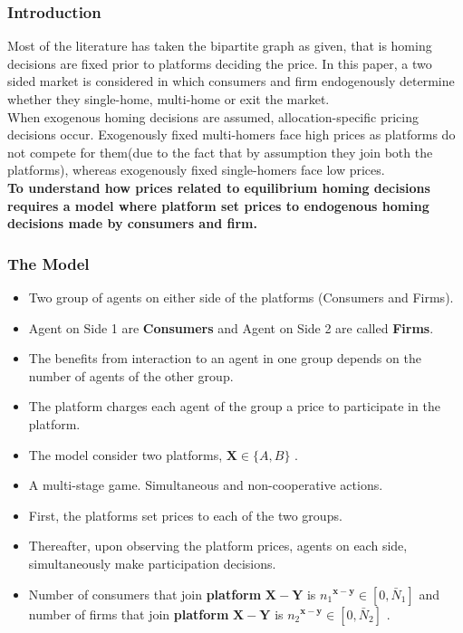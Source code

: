 \documentclass[11pt]{beamer}
\theoremstyle{boldstyle}
\begin{document}
		\begin{frame}
		\frametitle{Introduction}
		Most of the literature has taken the bipartite graph as given, that is homing decisions are fixed prior to platforms deciding the price. In this paper, a two sided market is considered in which consumers and firm endogenously determine whether they single-home, multi-home or exit the market. \\
		\vspace{0.1cm}
		When exogenous homing decisions are assumed, allocation-specific pricing decisions occur. Exogenously fixed multi-homers face high prices as platforms do not compete for them(due to the fact that by assumption they join both the platforms), whereas exogenously fixed single-homers  face low prices.\\
		\vspace{0.1cm}
		\textbf{To understand how prices related to equilibrium homing decisions requires a model where platform set prices to endogenous homing decisions made by consumers and firm.}
		\end{frame}
		\begin{frame}
			\frametitle{The Model}
			\begin{small}
				
			
			\begin{itemize}
				\item Two group of agents on either side of the platforms (Consumers and Firms). 
				\item Agent on Side 1 are \textbf{Consumers} and Agent on Side 2 are called \textbf{Firms}.
				\item The benefits from interaction to an agent in one group depends on the number of agents of the other group.
				\item The platform charges each agent of the group a price to participate in the platform. 
				\item The model consider two platforms, $\mathbf{X} \in {\{A,B}\}$ .
				\item A multi-stage game. Simultaneous and non-cooperative actions.
				\item First, the platforms set prices to each of the two groups. 
				\item Thereafter, upon observing the platform prices, agents on each side, simultaneously make participation decisions. 
				\item Number of consumers that join \textbf{platform} $\mathbf{X-Y}$  is ${n_1}^\mathbf{x-y} \in {[0,\bar{N}_1]}$ and number of firms that join \textbf{platform} $\mathbf{X-Y}$ is ${n_2}^\mathbf{x-y} \in {[0,\bar{N}_2]}$ .
			\end{itemize}
		\end{small}
			
		\end{frame}
		
\end{document}
